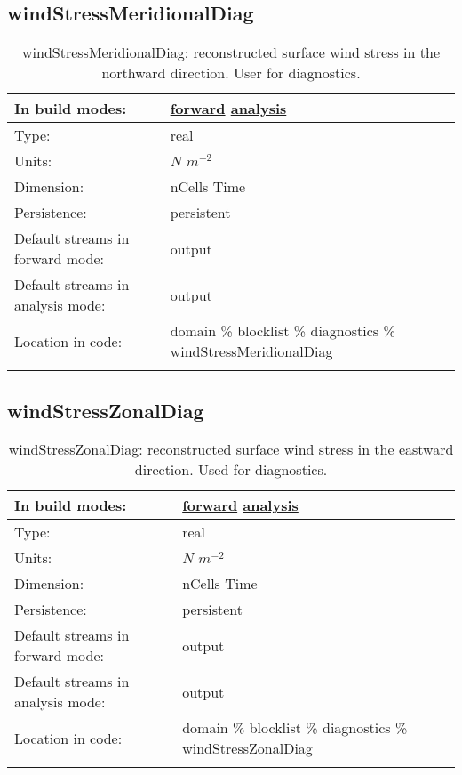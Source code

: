 \subsection[windStressMeridionalDiag]{windStressMeridionalDiag}
\label{subsec:var_sec_diagnostics_windStressMeridionalDiag}
\begin{center}
\begin{longtable}{| p{2.0in} | p{4.0in} |}
        \hline 
        In build modes: & \hyperref[subsec:forward_var_tab_diagnostics]{forward} \hyperref[subsec:analysis_var_tab_diagnostics]{analysis} \\
        \hline 
        Type: & real \\
        \hline 
        Units: & $N$ $m^{-2}$ \\
        \hline 
        Dimension: & nCells Time \\
        \hline 
        Persistence: & persistent \\
        \hline 
		 Default streams in forward mode: &  output \\
        \hline 
		 Default streams in analysis mode: &  output \\
        \hline 
		 Location in code: & domain \% blocklist \% diagnostics \% windStressMeridionalDiag \\
		 \hline 
    \caption{windStressMeridionalDiag: reconstructed surface wind stress in the northward direction. User for diagnostics.}
\end{longtable}
\end{center}
\subsection[windStressZonalDiag]{windStressZonalDiag}
\label{subsec:var_sec_diagnostics_windStressZonalDiag}
\begin{center}
\begin{longtable}{| p{2.0in} | p{4.0in} |}
        \hline 
        In build modes: & \hyperref[subsec:forward_var_tab_diagnostics]{forward} \hyperref[subsec:analysis_var_tab_diagnostics]{analysis} \\
        \hline 
        Type: & real \\
        \hline 
        Units: & $N$ $m^{-2}$ \\
        \hline 
        Dimension: & nCells Time \\
        \hline 
        Persistence: & persistent \\
        \hline 
		 Default streams in forward mode: &  output \\
        \hline 
		 Default streams in analysis mode: &  output \\
        \hline 
		 Location in code: & domain \% blocklist \% diagnostics \% windStressZonalDiag \\
		 \hline 
    \caption{windStressZonalDiag: reconstructed surface wind stress in the eastward direction. Used for diagnostics.}
\end{longtable}
\end{center}
